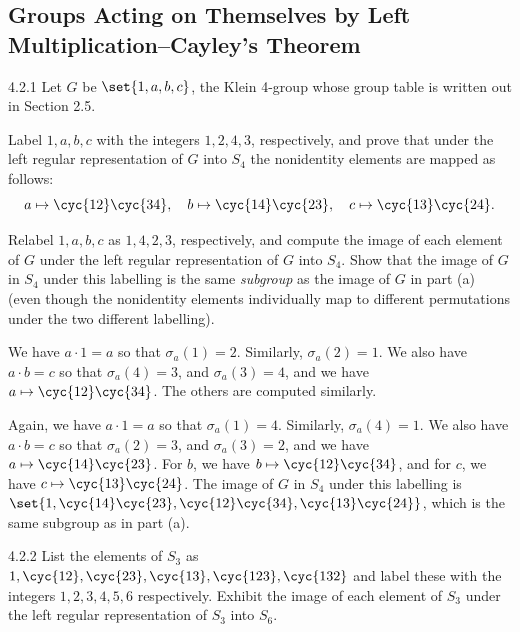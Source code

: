 \subsection{Groups Acting on Themselves by Left Multiplication--Cayley's Theorem}

\begin{exercise}{4.2.1}
	Let $G$ be $\set{1,a,b,c}$, the Klein 4-group whose group table is written out in Section 2.5.
	\begin{subexercises}
		\item Label $1,a,b,c$ with the integers $1,2,4,3$, respectively, and prove that under the left regular representation of $G$ into $S_4$ the nonidentity elements are mapped as follows:
		\[
			a \mapsto \cyc{1 2}\cyc{3 4}, \quad b \mapsto \cyc{1 4}\cyc{2 3}, \quad c \mapsto \cyc{1 3}\cyc{2 4}.
		\]
		\item Relabel $1,a,b,c$ as $1,4,2,3$, respectively, and compute the image of each element of $G$ under the left regular representation of $G$ into $S_4$.
		Show that the image of $G$ in $S_4$ under this labelling is the same \emph{subgroup} as the image of $G$ in part (a) (even though the nonidentity elements individually map to different permutations under the two different labelling).
	\end{subexercises}
\end{exercise}

\begin{solenum}
	\item We have $a \cdot 1 = a$ so that $\sigma_a(1) = 2$.
	Similarly, $\sigma_a(2) = 1$.
	We also have $a \cdot b = c$ so that $\sigma_a(4) = 3$, and $\sigma_a(3) = 4$, and we have $a \mapsto \cyc{1 2}\cyc{3 4}$.
	The others are computed similarly. 
	\item Again, we have $a \cdot 1 = a$ so that $\sigma_a(1) = 4$.
	Similarly, $\sigma_a(4) = 1$.
	We also have $a \cdot b = c$ so that $\sigma_a(2) = 3$, and $\sigma_a(3) = 2$, and we have $a \mapsto \cyc{1 4}\cyc{2 3}$.
	For $b$, we have $b \mapsto \cyc{1 2}\cyc{3 4}$, and for $c$, we have $c \mapsto \cyc{1 3}\cyc{2 4}$.
	The image of $G$ in $S_4$ under this labelling is $\set{1, \cyc{1 4}\cyc{2 3}, \cyc{1 2}\cyc{3 4}, \cyc{1 3}\cyc{2 4}}$, which is the same subgroup as in part (a).
\end{solenum}

\begin{exercise}{4.2.2}
	List the elements of $S_3$ as $1, \cyc{1 2}, \cyc{2 3}, \cyc{1 3}, \cyc{1 2 3}, \cyc{1 3 2}$ and label these with the integers $1,2,3,4,5,6$ respectively.
	Exhibit the image of each element of $S_3$ under the left regular representation of $S_3$ into $S_6$.
\end{exercise}

